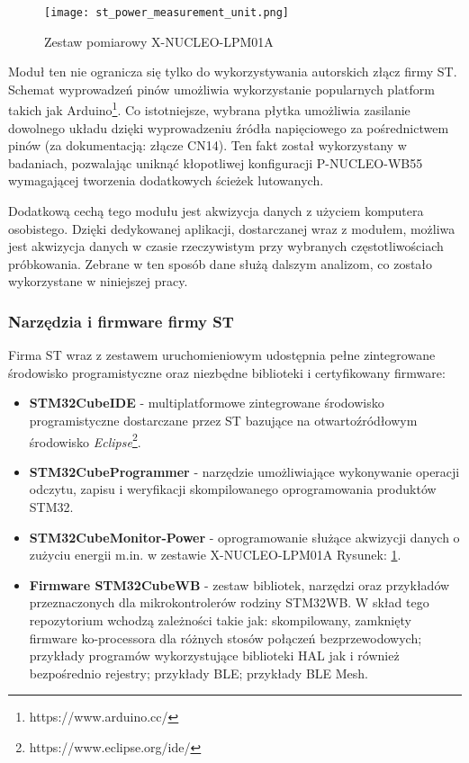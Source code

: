 \begin{figure}[!ht]
	\centering \texttt{[image: st\_power\_measurement\_unit.png]}
	\caption{Zestaw pomiarowy X-NUCLEO-LPM01A}
	\label{rys:nucleo_lpm01a}
\end{figure}

Moduł ten nie ogranicza się tylko do wykorzystywania autorskich złącz firmy ST. Schemat wyprowadzeń pinów
umożliwia wykorzystanie popularnych platform takich jak Arduino\footnote{https://www.arduino.cc/}. Co istotniejsze, wybrana płytka umożliwia
zasilanie dowolnego układu dzięki wyprowadzeniu źródła napięciowego za pośrednictwem pinów 
(za dokumentacją: złącze CN14). Ten fakt został wykorzystany w badaniach, pozwalając uniknąć kłopotliwej
konfiguracji P-NUCLEO-WB55 wymagającej tworzenia dodatkowych ścieżek lutowanych.

Dodatkową cechą tego modułu jest akwizycja danych z użyciem komputera osobistego. Dzięki dedykowanej
aplikacji, dostarczanej wraz z modułem, możliwa jest akwizycja danych w czasie rzeczywistym przy
wybranych częstotliwościach próbkowania. Zebrane w ten sposób dane służą dalszym analizom, co zostało
wykorzystane w niniejszej pracy. 

\subsubsection{Narzędzia i firmware firmy ST}
Firma ST wraz z zestawem uruchomieniowym udostępnia pełne zintegrowane środowisko
programistyczne oraz niezbędne biblioteki i certyfikowany firmware:

\begin{itemize}
\item \textbf{STM32CubeIDE} \cite{noauthor_stm32cubeide_2022} - multiplatformowe zintegrowane środowisko programistyczne
dostarczane przez ST bazujące na otwartoźródłowym środowisko \textit{Eclipse}\footnote{https://www.eclipse.org/ide/}.
\item \textbf{STM32CubeProgrammer} \cite{noauthor_stm32cubeprog_2022} - narzędzie umożliwiające wykonywanie operacji
odczytu, zapisu i weryfikacji skompilowanego oprogramowania produktów STM32. 
\item \textbf{STM32CubeMonitor-Power} \cite{noauthor_stm32cubemonpwr_2022} - oprogramowanie służące akwizycji danych
o zużyciu energii m.in. w zestawie X-NUCLEO-LPM01A Rysunek: \ref{rys:nucleo_lpm01a}.
\item \textbf{Firmware STM32CubeWB} \cite{noauthor_stm32cubewb_2022} - zestaw bibliotek, narzędzi oraz przykładów
przeznaczonych dla mikrokontrolerów rodziny STM32WB. W skład tego repozytorium wchodzą zależności takie jak:
skompilowany, zamknięty firmware ko-processora dla różnych stosów połączeń bezprzewodowych; przykłady programów
wykorzystujące biblioteki HAL jak i również bezpośrednio rejestry; przykłady BLE; przykłady BLE Mesh.
\end{itemize}

